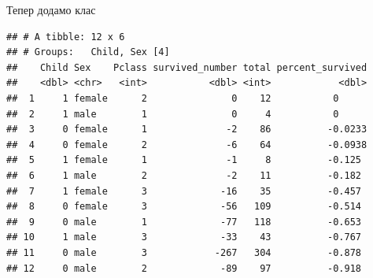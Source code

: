\documentclass[ignorenonframetext,]{beamer}
\newenvironment{Shaded}{\begin{snugshade}}{\end{snugshade}}
\newcommand{\DataTypeTok}[1]{\textcolor[rgb]{0.13,0.29,0.53}{#1}}
\newcommand{\DecValTok}[1]{\textcolor[rgb]{0.00,0.00,0.81}{#1}}
\newcommand{\KeywordTok}[1]{\textcolor[rgb]{0.13,0.29,0.53}{\textbf{#1}}}
\newcommand{\NormalTok}[1]{#1}
\newcommand{\OperatorTok}[1]{\textcolor[rgb]{0.81,0.36,0.00}{\textbf{#1}}}
\newcommand{\StringTok}[1]{\textcolor[rgb]{0.31,0.60,0.02}{#1}}
\begin{document}
\begin{frame}[fragile]{Тепер додамо клас}
\protect\hypertarget{ux442ux435ux43fux435ux440-ux434ux43eux434ux430ux43cux43e-ux43aux43bux430ux441}{}

\begin{Shaded}
\end{Shaded}

\begin{verbatim}
## # A tibble: 12 x 6
## # Groups:   Child, Sex [4]
##    Child Sex    Pclass survived_number total percent_survived
##    <dbl> <chr>   <int>           <dbl> <int>            <dbl>
##  1     1 female      2               0    12           0     
##  2     1 male        1               0     4           0     
##  3     0 female      1              -2    86          -0.0233
##  4     0 female      2              -6    64          -0.0938
##  5     1 female      1              -1     8          -0.125 
##  6     1 male        2              -2    11          -0.182 
##  7     1 female      3             -16    35          -0.457 
##  8     0 female      3             -56   109          -0.514 
##  9     0 male        1             -77   118          -0.653 
## 10     1 male        3             -33    43          -0.767 
## 11     0 male        3            -267   304          -0.878 
## 12     0 male        2             -89    97          -0.918
\end{verbatim}

\end{frame}
\end{document}
